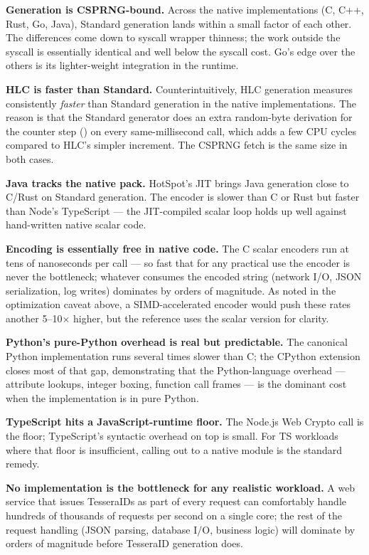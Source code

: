 \textbf{Generation is CSPRNG-bound.} Across the native implementations (C, C++, Rust, Go, Java), Standard generation lands within a small factor of each other. The differences come down to syscall wrapper thinness; the work outside the syscall is essentially identical and well below the syscall cost. Go's edge over the others is its lighter-weight  integration in the runtime.

\textbf{HLC is faster than Standard.} Counterintuitively, HLC generation measures consistently \emph{faster} than Standard generation in the native implementations. The reason is that the Standard generator does an extra random-byte derivation for the counter step () on every same-millisecond call, which adds a few CPU cycles compared to HLC's simpler increment. The CSPRNG fetch is the same size in both cases.

\textbf{Java tracks the native pack.} HotSpot's JIT brings Java generation close to C/Rust on Standard generation. The encoder is slower than C or Rust but faster than Node's TypeScript --- the JIT-compiled scalar loop holds up well against hand-written native scalar code.

\textbf{Encoding is essentially free in native code.} The C scalar encoders run at tens of nanoseconds per call --- so fast that for any practical use the encoder is never the bottleneck; whatever consumes the encoded string (network I/O, JSON serialization, log writes) dominates by orders of magnitude. As noted in the optimization caveat above, a SIMD-accelerated encoder would push these rates another 5--10$\times$ higher, but the reference uses the scalar version for clarity.

\textbf{Python's pure-Python overhead is real but predictable.} The canonical Python implementation runs several times slower than C; the CPython extension closes most of that gap, demonstrating that the Python-language overhead --- attribute lookups, integer boxing, function call frames --- is the dominant cost when the implementation is in pure Python.

\textbf{TypeScript hits a JavaScript-runtime floor.} The Node.js Web Crypto  call is the floor; TypeScript's syntactic overhead on top is small. For TS workloads where that floor is insufficient, calling out to a native module is the standard remedy.

\textbf{No implementation is the bottleneck for any realistic workload.} A web service that issues TesseraIDs as part of every request can comfortably handle hundreds of thousands of requests per second on a single core; the rest of the request handling (JSON parsing, database I/O, business logic) will dominate by orders of magnitude before TesseraID generation does.
